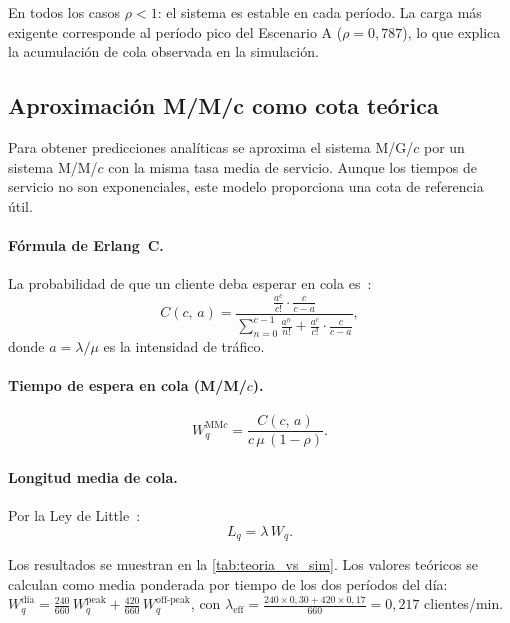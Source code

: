 En todos los casos $\rho < 1$: el sistema es estable en cada período.
La carga más exigente corresponde al período pico del Escenario A ($\rho =
0{,}787$), lo que explica la acumulación de cola observada en la simulación.

\subsection{Aproximación M/M/c como cota teórica}

Para obtener predicciones analíticas se aproxima el sistema M/G/$c$ por un
sistema M/M/$c$ con la misma tasa media de servicio.
Aunque los tiempos de servicio no son exponenciales, este modelo proporciona
una cota de referencia útil.

\paragraph{Fórmula de Erlang~C.}
La probabilidad de que un cliente deba esperar en cola es~\citep{banks2010discrete}:
\begin{equation}
  C(c,\,a) = \frac{\displaystyle\frac{a^c}{c!}\cdot\frac{c}{c - a}}
                  {\displaystyle\sum_{n=0}^{c-1}\frac{a^n}{n!}
                   + \frac{a^c}{c!}\cdot\frac{c}{c - a}},
  \label{eq:erlangC}
\end{equation}
donde $a = \lambda/\mu$ es la intensidad de tráfico.

\paragraph{Tiempo de espera en cola (M/M/$c$).}
\begin{equation}
  W_q^{\text{MM}c} = \frac{C(c,\,a)}{c\,\mu\,(1-\rho)}.
  \label{eq:Wq_mmc}
\end{equation}

\paragraph{Longitud media de cola.}
Por la Ley de Little~\citep{little1961proof}:
\begin{equation}
  L_q = \lambda\,W_q.
  \label{eq:little}
\end{equation}

Los resultados se muestran en la \cref{tab:teoria_vs_sim}.
Los valores teóricos se calculan como media ponderada por tiempo de los dos períodos
del día: $W_q^{\text{día}} = \frac{240}{660}\,W_q^{\text{peak}} + \frac{420}{660}\,W_q^{\text{off-peak}}$,
con $\lambda_{\text{eff}} = \frac{240 \times 0{,}30 + 420 \times 0{,}17}{660} = 0{,}217$ clientes/min.

